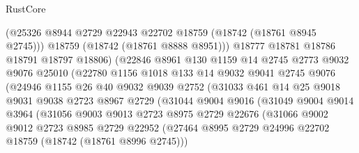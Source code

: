 \begin{lexlean}{RustCore}
\begin{coremodule}
                        (@25326 @8944 @2729 @22943 @22702 @18759 (@18742 (@18761 @8945 @2745)))
                        @18759
                        (@18742 (@18761 @8888 @8951)))
                      @18777
                      @18781
                      @18786
                      @18791
                      @18797
                      @18806)
                    (@22846
                      @8961
                      @130
                      @1159
                      @14
                      @2745
                      @2773
                      @9032
                      @9076
                      @25010
                      (@22780
                        @1156
                        @1018
                        @133
                        @14
                        @9032
                        @9041
                        @2745
                        @9076
                        (@24946
                          @1155
                          @26
                          @40
                          @9032
                          @9039
                          @2752
                          (@31033
                            @461
                            @14
                            @25
                            @9018
                            @9031
                            @9038
                            @2723
                            @8967
                            @2729
                            (@31044
                              @9004
                              @9016
                              (@31049
                                @9004
                                @9014
                                @3964
                                (@31056
                                  @9003
                                  @9013
                                  @2723
                                  @8975
                                  @2729
                                  @22676
                                  (@31066
                                    @9002
                                    @9012
                                    @2723
                                    @8985
                                    @2729
                                    @22952
                                    (@27464
                                      @8995
                                      @2729
                                      @24996
                                      @22702
                                      @18759
                                      (@18742 (@18761 @8996 @2745)))

\end{coremodule}
\end{lexlean}
